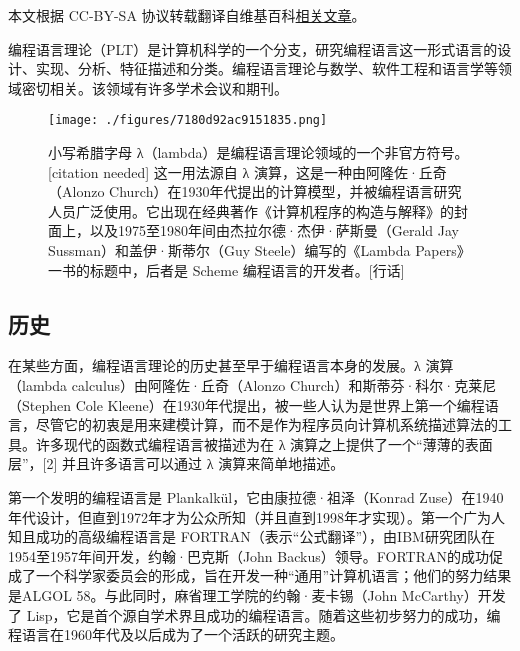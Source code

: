 
本文根据 CC-BY-SA 协议转载翻译自维基百科\href{https://en.wikipedia.org/wiki/Programming_language_theory}{相关文章}。

编程语言理论（PLT）是计算机科学的一个分支，研究编程语言这一形式语言的设计、实现、分析、特征描述和分类。编程语言理论与数学、软件工程和语言学等领域密切相关。该领域有许多学术会议和期刊。
\begin{figure}[ht]
\centering
\texttt{[image: ./figures/7180d92ac9151835.png]}
\caption{小写希腊字母 λ（lambda）是编程语言理论领域的一个非官方符号。[citation needed] 这一用法源自 λ 演算，这是一种由阿隆佐·丘奇（Alonzo Church）在1930年代提出的计算模型，并被编程语言研究人员广泛使用。它出现在经典著作《计算机程序的构造与解释》的封面上，以及1975至1980年间由杰拉尔德·杰伊·萨斯曼（Gerald Jay Sussman）和盖伊·斯蒂尔（Guy Steele）编写的《Lambda Papers》一书的标题中，后者是 Scheme 编程语言的开发者。[行话]} \label{fig_BCYY_1}
\end{figure}
\subsection{历史}  
在某些方面，编程语言理论的历史甚至早于编程语言本身的发展。λ 演算（lambda calculus）由阿隆佐·丘奇（Alonzo Church）和斯蒂芬·科尔·克莱尼（Stephen Cole Kleene）在1930年代提出，被一些人认为是世界上第一个编程语言，尽管它的初衷是用来建模计算，而不是作为程序员向计算机系统描述算法的工具。许多现代的函数式编程语言被描述为在 λ 演算之上提供了一个“薄薄的表面层”，[2] 并且许多语言可以通过 λ 演算来简单地描述。

第一个发明的编程语言是 Plankalkül，它由康拉德·祖泽（Konrad Zuse）在1940年代设计，但直到1972年才为公众所知（并且直到1998年才实现）。第一个广为人知且成功的高级编程语言是 FORTRAN（表示“公式翻译”），由IBM研究团队在1954至1957年间开发，约翰·巴克斯（John Backus）领导。FORTRAN的成功促成了一个科学家委员会的形成，旨在开发一种“通用”计算机语言；他们的努力结果是ALGOL 58。与此同时，麻省理工学院的约翰·麦卡锡（John McCarthy）开发了 Lisp，它是首个源自学术界且成功的编程语言。随着这些初步努力的成功，编程语言在1960年代及以后成为了一个活跃的研究主题。